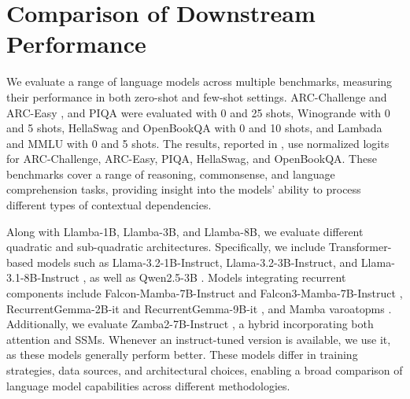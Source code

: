 \section{Comparison of Downstream Performance}
We evaluate a range of language models across multiple benchmarks, measuring their performance in both zero-shot and few-shot settings. ARC-Challenge and ARC-Easy \citep{arc}, and PIQA \citep{piqa} were evaluated with 0 and 25 shots, Winogrande \citep{winogrande} with 0 and 5 shots, HellaSwag \citep{hellaswag} and OpenBookQA \cite{OpenBookQA} with 0 and 10 shots, and Lambada \citep{lambada} and MMLU \citep{mmlu} with 0 and 5 shots. 
The results, reported in , use normalized logits for ARC-Challenge, ARC-Easy, PIQA, HellaSwag, and OpenBookQA. These benchmarks cover a range of reasoning, commonsense, and language comprehension tasks, providing insight into the models’ ability to process different types of contextual dependencies.

Along with Llamba-1B, Llamba-3B, and Llamba-8B, we evaluate different quadratic and sub-quadratic architectures. Specifically, we include Transformer-based models such as Llama-3.2-1B-Instruct, Llama-3.2-3B-Instruct, and Llama-3.1-8B-Instruct \citep{llama}, as well as Qwen2.5-3B \citep{qwen2}. Models integrating recurrent components include Falcon-Mamba-7B-Instruct and Falcon3-Mamba-7B-Instruct \citep{falcon}, RecurrentGemma-2B-it and RecurrentGemma-9B-it \citep{recurrentgemma}, and Mamba varoatopms \citep{mamba1,mamba2}. 
Additionally, we evaluate Zamba2-7B-Instruct \citep{zamba2}, a hybrid incorporating both attention and SSMs. 
Whenever an instruct-tuned version is available, we use it, as these models generally perform better. These models differ in training strategies, data sources, and architectural choices, enabling a broad comparison of language model capabilities across different methodologies.

